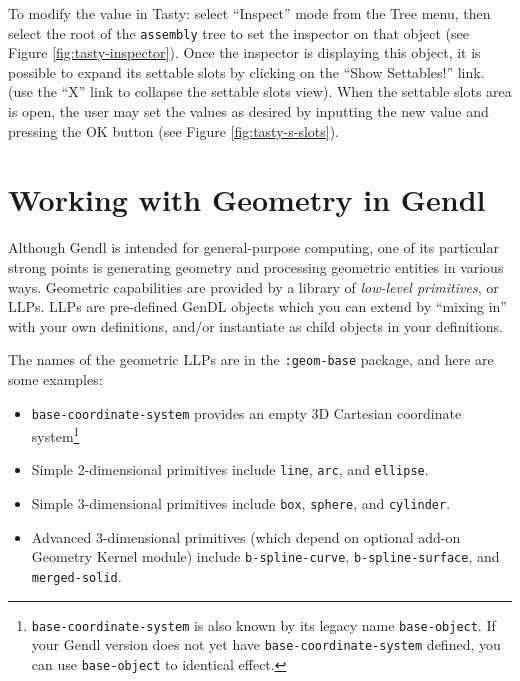 \documentclass [11pt]{book}
\begin{document}
To modify the value in Tasty: select ``Inspect'' mode from the Tree
menu, then select the root of the \texttt{assembly} tree to set the inspector on that object (see Figure 
\ref{fig:tasty-inspector}). Once the inspector is displaying this object, it is
possible to expand its settable slots by clicking on the ``Show
Settables!''  link. (use the ``X'' link to collapse the settable slots
view). When the settable slots area is open, the user may set the
values as desired by inputting the new value and pressing the OK
button (see Figure 
\ref{fig:tasty-s-slots}).



\chapter{Working with Geometry in Gendl}

\label{chap:workingwithgeometryingendl}



Although Gendl is intended for general-purpose computing, one
  of its particular strong points is generating geometry and
  processing geometric entities in various ways. Geometric
  capabilities are provided by a library of \emph{low-level primitives}, or LLPs. LLPs are pre-defined GenDL objects which you can
	extend by ``mixing in'' with your own definitions, and/or
	instantiate as child objects in your definitions.



The names of the geometric LLPs are in the \texttt{:geom-base} package, and here are some examples:

\begin{itemize}

\item \texttt{base-coordinate-system} provides an empty 3D Cartesian coordinate system\footnote{\texttt{base-coordinate-system} is also known by its legacy name \texttt{base-object}. If your Gendl version does not yet have \texttt{base-coordinate-system} defined, you can use \texttt{base-object} to identical effect.}

\item Simple 2-dimensional primitives include \texttt{line}, \texttt{arc}, and \texttt{ellipse}.

\item Simple 3-dimensional primitives include \texttt{box}, \texttt{sphere}, and \texttt{cylinder}.

\item Advanced 3-dimensional primitives (which depend on optional add-on Geometry Kernel module) include \texttt{b-spline-curve}, \texttt{b-spline-surface}, and \texttt{merged-solid}.

\end{itemize}
\end{document}
